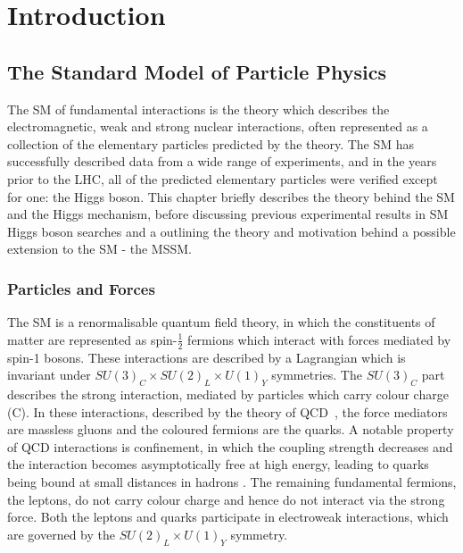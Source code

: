 \chapter{Introduction}
\label{chap:theory}

\section{The Standard Model of Particle Physics}
\label{sec:theSM}

The \ac{SM} of fundamental interactions is the theory
which describes the electromagnetic, weak and strong nuclear interactions, often
represented as a collection of the elementary particles predicted by the theory.
The \ac{SM} has successfully described data from a wide range of experiments, and in the 
years prior to the LHC, all of the predicted elementary particles were verified 
except for one: the Higgs boson. This chapter briefly describes the theory
behind the \ac{SM} and the Higgs mechanism, before discussing previous
experimental results in \ac{SM} Higgs boson searches and a outlining the theory
and motivation behind a possible extension to the \ac{SM} - the \ac{MSSM}.

\subsection{Particles and Forces} 
\label{sec:particlesandforces}

The \ac{SM} is a renormalisable quantum field theory, in which the constituents of
matter are represented as spin-$\frac{1}{2}$ fermions which interact with
forces mediated by spin-1 bosons. These interactions are described by a
Lagrangian which is invariant under $SU(3)_{C} \times SU(2)_{L} \times U(1)_{Y}$
symmetries. The $SU(3)_{C}$ part describes the strong interaction, mediated by
particles which carry colour charge (C). In these interactions, described by the
theory of \ac{QCD}~\cite{Griffiths:2008nx,Perkins:2000uq}, the force mediators are massless gluons
and the coloured fermions are the quarks. A notable property of QCD interactions
is confinement, in which the coupling strength decreases and the interaction
becomes asymptotically free at high energy, leading to quarks being bound at 
small distances in hadrons \cite{Gross:1973id,Politzer:1973fx}. The remaining fundamental fermions,
the leptons, do not carry colour charge and hence do not interact via the strong
force. Both the leptons and quarks participate in electroweak interactions,
which are governed by the $SU(2)_{L} \times U(1)_{Y}$ symmetry.

